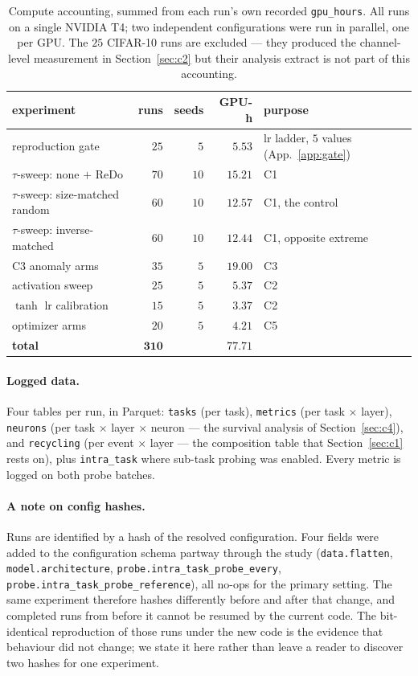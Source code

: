 \documentclass[10pt]{article}
\begin{document}
\begin{table}[h]
\centering
\caption{Compute accounting, summed from each run's own recorded
\texttt{gpu\_hours}. All runs on a single NVIDIA T4; two independent
configurations were run in parallel, one per GPU. The $25$ CIFAR-10 runs are
excluded --- they produced the channel-level measurement in
Section~\ref{sec:c2} but their analysis extract is not part of this accounting.}
\label{tab:compute}
\small
\begin{tabular}{@{}l r r r l@{}}
\toprule
experiment & runs & seeds & GPU-h & purpose \\
\midrule
reproduction gate & $25$ & $5$ & $5.53$ & lr ladder, $5$ values (App.~\ref{app:gate}) \\
$\tau$-sweep: none $+$ ReDo & $70$ & $10$ & $15.21$ & C1 \\
$\tau$-sweep: size-matched random & $60$ & $10$ & $12.57$ & C1, the control \\
$\tau$-sweep: inverse-matched & $60$ & $10$ & $12.44$ & C1, opposite extreme \\
C3 anomaly arms & $35$ & $5$ & $19.00$ & C3 \\
activation sweep & $25$ & $5$ & $5.37$ & C2 \\
$\tanh$ lr calibration & $15$ & $5$ & $3.37$ & C2 \\
optimizer arms & $20$ & $5$ & $4.21$ & C5 \\
\midrule
\textbf{total} & $\mathbf{310}$ & & $\mathbf{77.71}$ & \\
\bottomrule
\end{tabular}
\end{table}

\paragraph{Logged data.} Four tables per run, in Parquet: \texttt{tasks} (per
task), \texttt{metrics} (per task $\times$ layer), \texttt{neurons} (per task
$\times$ layer $\times$ neuron --- the survival analysis of
Section~\ref{sec:c4}), and \texttt{recycling} (per event $\times$ layer --- the
composition table that Section~\ref{sec:c1} rests on), plus \texttt{intra\_task}
where sub-task probing was enabled. Every metric is logged on both probe
batches.

\paragraph{A note on config hashes.} Runs are identified by a hash of the
resolved configuration. Four fields were added to the configuration schema
partway through the study (\texttt{data.flatten},
\texttt{model.architecture}, \texttt{probe.intra\_task\_probe\_every},
\texttt{probe.intra\_task\_probe\_reference}), all no-ops for the primary
setting. The same experiment therefore hashes differently before and after that
change, and completed runs from before it cannot be resumed by the current code.
The bit-identical reproduction of those runs under the new code is the evidence
that behaviour did not change; we state it here rather than leave a reader to
discover two hashes for one experiment.
\end{document}
